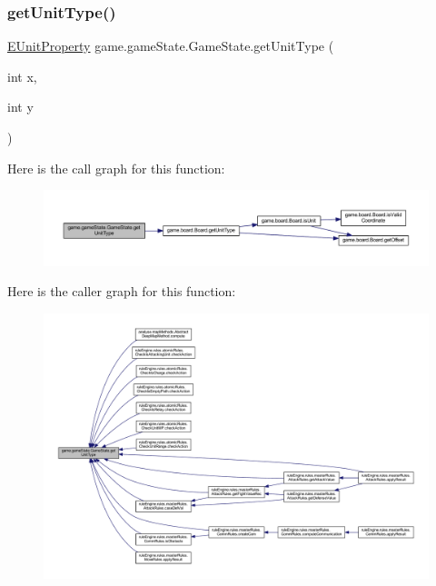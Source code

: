 \subsubsection{\texorpdfstring{get\+Unit\+Type()}{getUnitType()}}
{\footnotesize\ttfamily \mbox{\hyperlink{enumrule_engine_1_1entity_1_1_e_unit_property}{E\+Unit\+Property}} game.\+game\+State.\+Game\+State.\+get\+Unit\+Type (\begin{DoxyParamCaption}\item[{int}]{x,  }\item[{int}]{y }\end{DoxyParamCaption})\hspace{0.3cm}{\ttfamily [inline]}}

Here is the call graph for this function\+:
\nopagebreak
\begin{figure}[H]
\begin{center}
\leavevmode
\includegraphics[width=350pt]{classgame_1_1game_state_1_1_game_state_aab7480b446f4745f84e9a8831692a472_cgraph}
\end{center}
\end{figure}
Here is the caller graph for this function\+:
\nopagebreak
\begin{figure}[H]
\begin{center}
\leavevmode
\includegraphics[width=350pt]{classgame_1_1game_state_1_1_game_state_aab7480b446f4745f84e9a8831692a472_icgraph}
\end{center}
\end{figure}
\mbox{\label{classgame_1_1game_state_1_1_game_state_ab7f97a46f9310d08bd3358755168262c}} 
